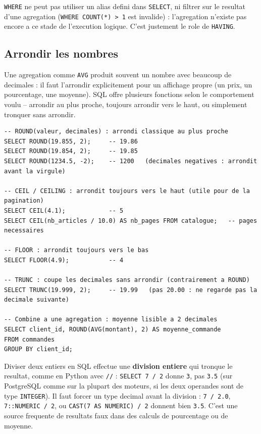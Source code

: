 \documentclass[11pt,a4paper]{article}
\begin{document}
\begin{piege}
\texttt{WHERE} ne peut pas utiliser un alias defini dans \texttt{SELECT}, ni
filtrer sur le resultat d'une agregation (\texttt{WHERE COUNT(*) > 1} est
invalide) : l'agregation n'existe pas encore a ce stade de l'execution logique.
C'est justement le role de \texttt{HAVING}.
\end{piege}

\subsection{Arrondir les nombres}
Une agregation comme \texttt{AVG} produit souvent un nombre avec beaucoup de
decimales : il faut l'arrondir explicitement pour un affichage propre (un
prix, un pourcentage, une moyenne). SQL offre plusieurs fonctions selon le
comportement voulu -- arrondir au plus proche, toujours arrondir vers le haut,
ou simplement tronquer sans arrondir.

\begin{lstlisting}
-- ROUND(valeur, decimales) : arrondi classique au plus proche
SELECT ROUND(19.855, 2);     -- 19.86
SELECT ROUND(19.854, 2);     -- 19.85
SELECT ROUND(1234.5, -2);    -- 1200   (decimales negatives : arrondit avant la virgule)

-- CEIL / CEILING : arrondit toujours vers le haut (utile pour de la pagination)
SELECT CEIL(4.1);            -- 5
SELECT CEIL(nb_articles / 10.0) AS nb_pages FROM catalogue;   -- pages necessaires

-- FLOOR : arrondit toujours vers le bas
SELECT FLOOR(4.9);           -- 4

-- TRUNC : coupe les decimales sans arrondir (contrairement a ROUND)
SELECT TRUNC(19.999, 2);     -- 19.99   (pas 20.00 : ne regarde pas la decimale suivante)

-- Combine a une agregation : moyenne lisible a 2 decimales
SELECT client_id, ROUND(AVG(montant), 2) AS moyenne_commande
FROM commandes
GROUP BY client_id;
\end{lstlisting}

\begin{piege}
Diviser deux entiers en SQL effectue une \textbf{division entiere} qui tronque
le resultat, comme en Python avec \texttt{//} : \texttt{SELECT 7 / 2} donne
\texttt{3}, pas \texttt{3.5} (sur PostgreSQL comme sur la plupart des moteurs,
si les deux operandes sont de type \texttt{INTEGER}). Il faut forcer un type
decimal avant la division : \texttt{7 / 2.0}, \texttt{7::NUMERIC / 2}, ou
\texttt{CAST(7 AS NUMERIC) / 2} donnent bien \texttt{3.5}. C'est une source
frequente de resultats faux dans des calculs de pourcentage ou de moyenne.
\end{piege}
\end{document}
